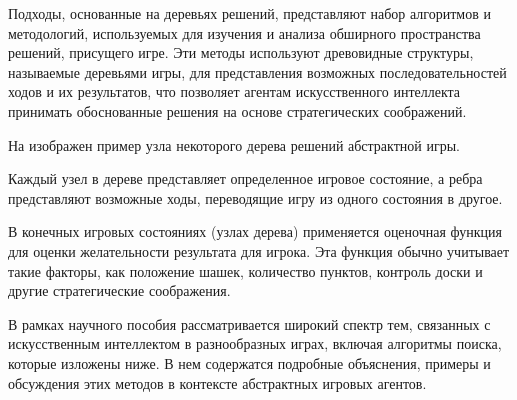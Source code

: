 Подходы, основанные на деревьях решений, представляют набор алгоритмов и методологий, используемых для изучения и анализа обширного пространства решений, присущего игре. Эти методы используют древовидные структуры, называемые деревьями игры, для представления возможных последовательностей ходов и их результатов, что позволяет агентам искусственного интеллекта принимать обоснованные решения на основе стратегических соображений.

На  изображен пример узла некоторого дерева решений абстрактной игры.


Каждый узел в дереве представляет определенное игровое состояние, а ребра представляют возможные ходы, переводящие игру из одного состояния в другое.

В конечных игровых состояниях (узлах дерева) применяется оценочная функция для оценки желательности результата для игрока. Эта функция обычно учитывает такие факторы, как положение шашек, количество пунктов, контроль доски и другие стратегические соображения.

В рамках научного пособия \cite{ai-modern-approach} рассматривается широкий спектр тем, связанных с искусственным интеллектом в разнообразных играх, включая алгоритмы поиска, которые изложены ниже. В нем содержатся подробные объяснения, примеры и обсуждения этих методов в контексте абстрактных игровых агентов.
